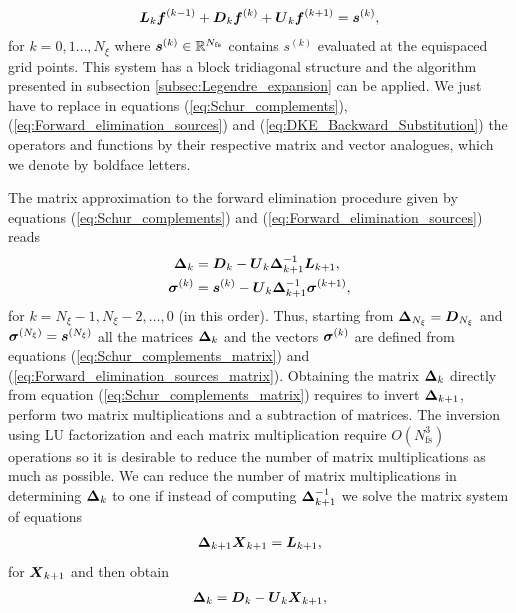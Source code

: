 \documentclass[10pt]{iopart}
\begin{document}
\begin{align}
	\vb*{L}_k  \vb*{f}^{(k-1)} + \vb*{D}_k  \vb*{f}^{(k)} + \vb*{U}_k   \vb*{f}^{(k+1)} = \vb*{s}^{(k)},   \label{eq:DKE_Legendre_expansion_Fourier_collocation}
\end{align}
for $k=0,1\ldots, N_\xi$ where $\vb*{s}^{(k)}\in\mathbb{R}^{N_{\text{fs}}}$
contains $s^{(k)}$ evaluated at the equispaced grid points. This system has a block tridiagonal structure and the algorithm presented in subsection \ref{subsec:Legendre_expansion} can be applied. We just have to replace in equations (\ref{eq:Schur_complements}), (\ref{eq:Forward_elimination_sources}) and (\ref{eq:DKE_Backward_Substitution}) the operators and functions by their respective matrix and vector analogues, which we denote by boldface letters. 

The matrix approximation to the forward elimination procedure given by equations (\ref{eq:Schur_complements}) and (\ref{eq:Forward_elimination_sources}) reads
%
\begin{align}
	\vb*{\Delta}_k & = \vb*{D}_k - \vb*{U}_{k} \vb*{\Delta}_{k+1}^{-1} \vb*{L}_{k+1}, 
	\label{eq:Schur_complements_matrix}
	\\
	\vb*{\sigma}^{(k)} & = \vb*{s}^{(k)} - \vb*{U}_{k}  \vb*{\Delta}_{k+1}^{-1}    \vb*{\sigma}^{(k+1)},
	\label{eq:Forward_elimination_sources_matrix}
\end{align}
for $k=N_\xi-1, N_\xi-2, \ldots, 0$ (in this order). Thus, starting from $\vb*{\Delta}_{N_\xi}=\vb*{D}_{N_\xi}$ and $\vb*{\sigma}^{(N_\xi)}=\vb*{s}^{(N_\xi)}$ all the matrices $\vb*{\Delta}_k$ and the vectors $\vb*{\sigma}^{(k)}$ are defined from equations (\ref{eq:Schur_complements_matrix}) and (\ref{eq:Forward_elimination_sources_matrix}). Obtaining the matrix $\vb*{\Delta}_k$ directly from equation (\ref{eq:Schur_complements_matrix}) requires to invert $\vb*{\Delta}_{k+1}$, perform two matrix multiplications and a subtraction of matrices. The inversion using LU factorization and each matrix multiplication require $O(N_{\text{fs}}^3)$ operations so it is desirable to reduce the number of matrix multiplications as much as possible. We can reduce the number of matrix multiplications in determining $\vb*{\Delta}_{k}$ to one if instead of computing $\vb*{\Delta}_{k+1}^{-1}$ we solve the matrix system of equations
%
\begin{align}
	\vb*{\Delta}_{k+1} \vb*{X}_{k+1} = \vb*{L}_{k+1},
	\label{eq:Forward_elimination_X}  
\end{align}
for $\vb*{X}_{k+1}$ and then obtain 
%
\begin{align}
	\vb*{\Delta}_k = \vb*{D}_k - \vb*{U}_{k}\vb*{X}_{k+1}, 
	\label{eq:Schur_complements_Fourier_collocation}
\end{align}
\end{document}
